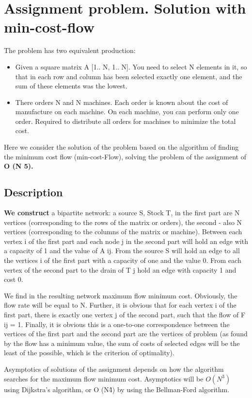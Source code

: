 \section{ Assignment problem. Solution with min-cost-flow }
The problem has two equivalent production:

\begin{itemize} \item Given a square matrix A [1.. N, 1.. N]. You need to select N elements in it, so that in each row and column has been selected exactly one element, and the sum of these elements was the lowest. \item There orders N and N machines. Each order is known about the cost of manufacture on each machine. On each machine, you can perform only one order. Required to distribute all orders for machines to minimize the total cost. \end{itemize}
Here we consider the solution of the problem based on the algorithm of finding the minimum cost flow (min-cost-Flow), solving the problem of the assignment of \textbf{O (N 5).}

\subsection{ Description }
\textbf{We construct} a bipartite network: a source S, Stock T, in the first part are N vertices (corresponding to the rows of the matrix or orders), the second - also N vertices (corresponding to the columns of the matrix or machine). Between each vertex i of the first part and each node j in the second part will hold an edge with a capacity of 1 and the value of A ij. From the source S will hold an edge to all the vertices i of the first part with a capacity of one and the value 0. From each vertex of the second part to the drain of T j hold an edge with capacity 1 and cost 0.

We find in the resulting network maximum flow minimum cost. Obviously, the flow rate will be equal to N. Further, it is obvious that for each vertex i of the first part, there is exactly one vertex j of the second part, such that the flow of F ij = 1. Finally, it is obvious this is a one-to-one correspondence between the vertices of the first part and the second part are the vertices of problem (as found by the flow has a minimum value, the sum of costs of selected edges will be the least of the possible, which is the criterion of optimality).

Asymptotics of solutions of the assignment depends on how the algorithm searches for the maximum flow minimum cost. Asymptotics will be \textbf{$O(N^3)$} using Dijkstra's algorithm, or O (N\^4) by using the Bellman-Ford algorithm.

